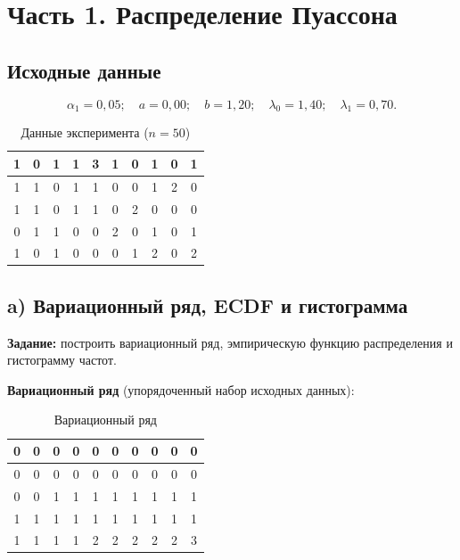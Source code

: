 \documentclass[12pt,a4paper]{article}
\begin{document}
	\tableofcontents
	\newpage
	
	\section{Часть 1. Распределение Пуассона}
	
	\subsection{Исходные данные}
	
	\[
	\alpha_1 = 0{,}05;\quad a = 0{,}00;\quad b = 1{,}20;\quad
	\lambda_0 = 1{,}40;\quad \lambda_1 = 0{,}70.
	\]
	
	\begin{table}[H]
		\centering
		\begin{tabular}{|c|c|c|c|c|c|c|c|c|c|}
			\hline
			1&0&1&1&3&1&0&1&0&1\\
			\hline
			1&1&0&1&1&0&0&1&2&0\\
			\hline
			1&1&0&1&1&0&2&0&0&0\\
			\hline
			0&1&1&0&0&2&0&1&0&1\\
			\hline
			1&0&1&0&0&0&1&2&0&2\\
			\hline
		\end{tabular}
		\caption{Данные эксперимента ($n=50$)}
	\end{table}
	
	\subsection{a) Вариационный ряд, ECDF и гистограмма}
	
	\textbf{Задание:} построить вариационный ряд, эмпирическую функцию распределения
	и гистограмму частот.
	
	\textbf{Вариационный ряд} (упорядоченный набор исходных данных):
	
	\begin{table}[H]
		\centering
		\begin{tabular}{|c|c|c|c|c|c|c|c|c|c|}
			\hline
			0&0&0&0&0&0&0&0&0&0\\
			\hline
			0&0&0&0&0&0&0&0&0&0\\
			\hline
			0&0&1&1&1&1&1&1&1&1\\
			\hline
			1&1&1&1&1&1&1&1&1&1\\
			\hline
			1&1&1&1&2&2&2&2&2&3\\
			\hline
		\end{tabular}
		\caption{Вариационный ряд}
	\end{table}
	
\end{document}
